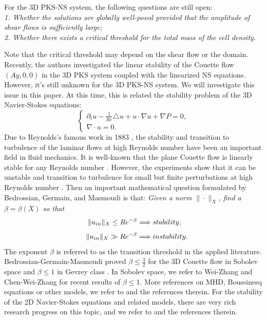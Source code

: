 \documentclass[12pt, reqno]{amsart}
\numberwithin{equation}{section}
\begin{document}
For the 3D PKS-NS system, the following questions are still open:\\
{\it 1. Whether the solutions are globally well-posed provided that the amplitude of shear flows is sufficiently large;}\\
{\it 2.  Whether there exists a critical threshold for the total mass of the cell density.}

Note that the critical threshold may depend on the shear flow or the domain. Recently, the authors \cite{CWW1} investigated the linear stability of the Couette flow $(Ay,0,0)$ in the 3D PKS system coupled with the linearized NS equations. However, it's still unknown for the 3D PKS-NS system. We will investigate this issue in this paper.
At this time, this is related the stability problem of the 3D Navier-Stokes equations:
\begin{equation}\label{eq:3DNS}
	\left\{
	\begin{array}{lr}
		\partial_tu
		-\frac{1}{Re}\triangle u+u\cdot\nabla u+\nabla P=0, \\
		\nabla \cdot u=0.
	\end{array}
	\right.
\end{equation}
Due to Reynolds's famous work in 1883 \cite{Re1883}, the stability and transition
to turbulence of the laminar flows at high Reynolds number have been an important
field in fluid mechanics. It is well-known that the plane
Couette flow is linearly stable for any Reynolds number  \cite{DR1981}. However,
the experiments show that it can be unstable and transition to turbulence for
small but finite perturbations at high Reynolds number \cite{C2002}.   
Then an important mathematical question 
	formulated by Bedrossian, Germain, and
	Masmoudi  \cite{Bedro1} is that:
{\it Given a norm
	$\|\cdot\|_X$, find a $\beta=\beta(X)$ so that
	$$~\|u_{\rm in}\|_X\leq Re^{-\beta}\Longrightarrow {\rm stability},$$
	$$\quad\|u_{\rm in}\|_X\gg Re^{-\beta}\Longrightarrow {\rm instability}.$$}
The exponent $\beta$ is referred to as the transition threshold in the applied literature.
\textcolor[rgb]{0,0,0}{
	Bedrossian-Germain-Masmoudi proved $\beta\leq \frac{3}{2}$ for the 3D Couette flow \cite{Bedro1} in Sobolev space and $\beta\leq 1$ in Gevrey class \cite{BGM2022}.}
In Sobolev space, we refer to Wei-Zhang \cite{wei2} and Chen-Wei-Zhang \cite{Chen1} for  recent results of $\beta\leq 1$. More references on MHD, Boussinesq equations or other models, we refer to \cite{HSX2024-1,HSX2024-2,LISS2020,NW1,ZZZ2022} and the references therein.
For the stability of the 2D Navier-Stokes equations and related models, there are  very rich research progress on this topic, and we refer to \cite{BMV2016,BVW2018,WZ2023,MZ2022,DWZ2021,BHIW2023} and the references therein.
\end{document}
